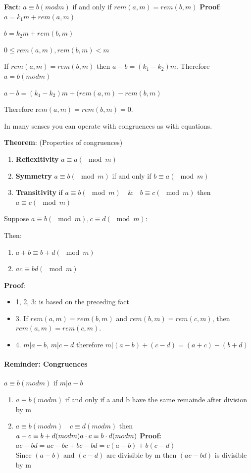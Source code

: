\documentclass[9pt, letterpaper, oneside]{article}
\begin{document}
\textbf{Fact}: $a \equiv b (mod m)$ if and only if $rem(a, m) = rem(b, m)$
\textbf{Proof}: 
$a = k_1m + rem(a, m)$

$b = k_2m + rem(b, m)$

$0 \leq rem(a, m), rem(b, m) < m$

If $rem(a, m) = rem(b, m)$ then $a - b = (k_1 - k_2)m$. Therefore $a =b(mod m)$

$a - b = (k_1 - k_2)m + (rem(a, m ) - rem(b, m)$

Therefore r$em(a, m) = rem(b, m) = 0$.

In many senses you can operate with congruences as with equations.

\textbf{Theorem}: (Properties of congruences)
\begin{enumerate}
    \item \textbf{Reflexitivity} $a \equiv a (\mod m)$
    \item \textbf{Symmetry} $a \equiv b (\mod m)$ if and only if $b \equiv a (\mod m)$
    \item \textbf{Transitivity} if $a \equiv b (\mod m) \quad \& \quad b \equiv c (\mod m)$ then $a \equiv c (\mod m)$
\end{enumerate}

Suppose $a \equiv b (\mod m), c \equiv d (\mod m)$:

Then:
\begin{enumerate}
    \item $a + b \equiv b + d (\mod m)$
    \item $ac \equiv bd (\mod m)$
\end{enumerate}

\textbf{Proof}: 
\begin{itemize}
	\item 1, 2, 3: is based on the preceding fact
	\item 3. If $rem(a, m) = rem(b, m)$ and $rem(b, m) = rem(c, m)$, then $rem(a, m) = rem(c, m)$.
	\item 4. $m | {a - b}$, $m | c - d$ therefore $m | (a-b) + (c-d) = (a + c) - (b + d)$
\end{itemize}


\paragraph{Reminder: Congruences}

$a \equiv b (mod m)$ if $m | a - b$

\begin{enumerate}
    \item $a \equiv b (mod m)$ if and only if a and b have the same remainde after division by m
    \item $a \equiv b (mod m) \quad c \equiv d (mod m)$ then \\
        $a + c \equiv b + d (mod m) \\
        a \cdot c \equiv b \cdot d (mod m) \\$
        \textbf{Proof:} $ac - bd = ac - bc + bc - bd = c(a-b) + b(c-d)$ \\
        Since $(a-b)$ and $(c-d)$ are divisible by m then $(ac - bd)$ is divisible by m
\end{enumerate} 
\end{document}
